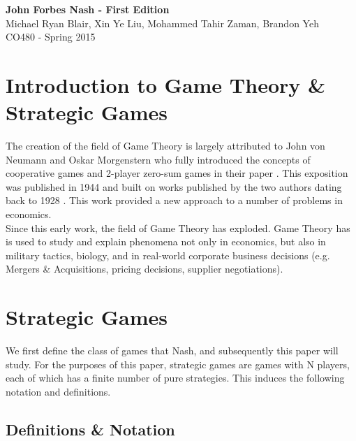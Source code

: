 \documentclass[12pt]{article}
\begin{document}
	
	\begin{center}
		\vspace*{3cm}	
		\textbf{\LARGE John Forbes Nash - First Edition}\\
		\vspace{5pt}
		\large Michael Ryan Blair, Xin Ye Liu, Mohammed Tahir Zaman, Brandon Yeh\\
		\vspace{5pt}
		CO480 - Spring 2015\\
	\end{center}
	
	\newpage
	
	\tableofcontents
	
	\newpage
	
	\singlespacing
	
	\section{Introduction to Game Theory \& Strategic Games}
	The creation of the field of Game Theory is largely attributed to John von Neumann and Oskar Morgenstern who fully introduced the concepts of cooperative games and 2-player zero-sum games in their paper \cite{1} . This exposition was published in 1944 and built on works published by the two authors dating back to 1928 \cite{2}. This work provided a new approach to a number of problems in economics. \\
	
	Since this early work, the field of Game Theory has exploded. Game Theory has is used to study and explain phenomena not only in economics, but also in military tactics, biology, and in real-world corporate business decisions (e.g. Mergers \& Acquisitions, pricing decisions, supplier negotiations).
	
	\section{Strategic Games}
	
	We first define the class of games that Nash, and subsequently this paper will study. For the purposes of this paper, strategic games are games with N players, each of which has a finite number of pure strategies. This induces the following notation and definitions.
	
	\subsection{Definitions \& Notation}
	
\end{document}
